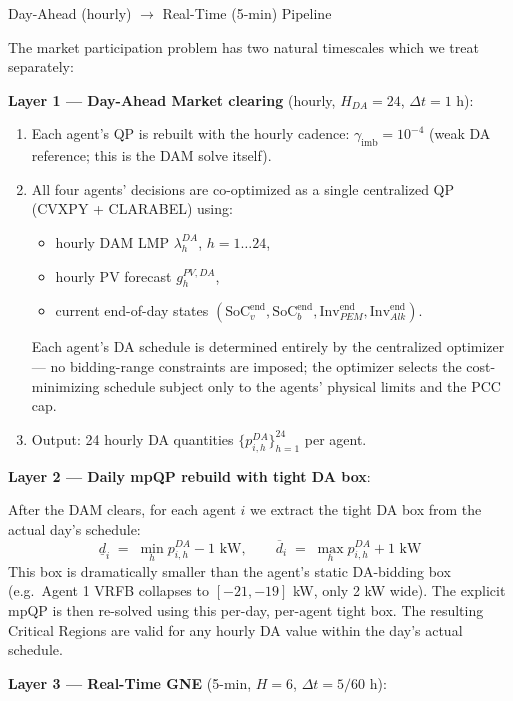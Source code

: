 \documentclass[11pt, letterpaper]{article}
\newcommand{\Dt}{\Delta t}
\begin{document}
\begin{answerbox}{Day-Ahead (hourly) $\to$ Real-Time (5-min) Pipeline}

The market participation problem has two natural timescales which we treat separately:

\textbf{Layer 1 — Day-Ahead Market clearing} (hourly, $H_{DA} = 24$, $\Dt = 1$ h):
\begin{enumerate}[nosep]
    \item Each agent's QP is rebuilt with the hourly cadence: $\gamma_{\text{imb}} = 10^{-4}$ (weak DA reference; this is the DAM solve itself).
    \item All four agents' decisions are co-optimized as a single centralized QP (CVXPY + CLARABEL) using:
    \begin{itemize}[nosep]
        \item hourly DAM LMP $\lambda^{DA}_h$, $h = 1\ldots24$,
        \item hourly PV forecast $g^{PV,DA}_h$,
        \item current end-of-day states $(\text{SoC}_v^{\text{end}}, \text{SoC}_b^{\text{end}}, \text{Inv}_{PEM}^{\text{end}}, \text{Inv}_{Alk}^{\text{end}})$.
    \end{itemize}
    Each agent's DA schedule is determined entirely by the centralized optimizer — no bidding-range constraints are imposed; the optimizer selects the cost-minimizing schedule subject only to the agents' physical limits and the PCC cap.
    \item Output: 24 hourly DA quantities $\{p^{DA}_{i,h}\}_{h=1}^{24}$ per agent.
\end{enumerate}

\textbf{Layer 2 — Daily mpQP rebuild with tight DA box}:

After the DAM clears, for each agent $i$ we extract the tight DA box from the actual day's schedule:
\[
\underline{d}_i \;=\; \min_h p^{DA}_{i,h} - 1\text{ kW}, \qquad
\overline{d}_i \;=\; \max_h p^{DA}_{i,h} + 1\text{ kW}
\]
This box is dramatically smaller than the agent's static DA-bidding box (e.g.\ Agent 1 VRFB collapses to $[-21, -19]$ kW, only 2 kW wide). The explicit mpQP is then re-solved using this per-day, per-agent tight box. The resulting Critical Regions are valid for any hourly DA value within the day's actual schedule.

\textbf{Layer 3 — Real-Time GNE} (5-min, $H = 6$, $\Dt = 5/60$ h):


\end{answerbox}
\end{document}
